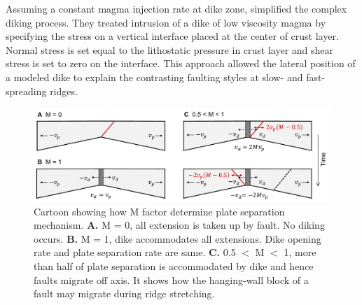 \documentclass[letterpaper,12pt,notitle]{memphisthesis}                     %
\begin{document}
Assuming a constant magma injection rate at dike zone, \citet{Buck1998} simplified the complex diking process. They treated intrusion of a dike of low viscosity magma by specifying the stress on a vertical interface placed at the center of crust layer. Normal stress is set equal to the lithostatic pressure in crust layer and shear stress is set to zero on the interface.
This approach allowed the lateral position of a modeled dike to explain the contrasting faulting styles at slow- and fast-spreading ridges.

\begin{figure}[!htb]
    \centering
    \includegraphics[width=0.99\linewidth]{./figs/mfactor.pdf}
    \caption{Cartoon showing how M factor determine plate separation mechanism. \textbf{A.} M = 0, all extension is taken up by fault. No diking occurs. \textbf{B.} M = 1, dike accommodates all extensions. Dike opening rate and plate separation rate are same. \textbf{C.} 0.5 $<$ M $<$ 1, more than half of plate separation is accommodated by dike and hence faults migrate off axis. It shows how the hanging-wall block of a fault may migrate during ridge stretching.}
    \label{fig:mcartoon}
\end{figure}
\end{document}
